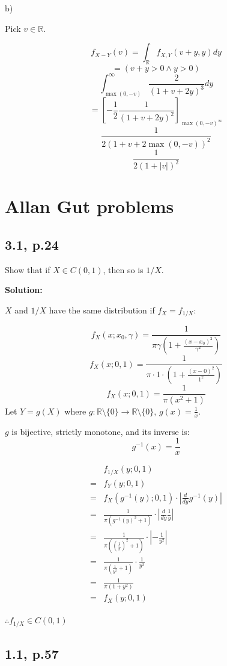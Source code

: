 \documentclass{article}
\begin{document}
b)

Pick \(v\in \mathbb{R}\).

\[f_{X-Y}(v) = \int_\mathbb{R} f_{X,Y}(v+y,y)dy\]
\[=(v+y>0 \wedge y>0)\]
\[\int_{\max(0,-v)}^\infty \frac{2}{(1+v+2y)^3}dy\]
\[=[-\frac{1}{2} \frac{1}{(1+v+2y)^2}]_{\max(0,-v)^\infty}\]
\[\frac{1}{2(1+v+2\max(0,-v))^2}\]
\[\frac{1}{2(1+|v|)^2}\]

\section{Allan Gut problems}
\subsection{3.1, p.24}

Show that if \(X \in C(0,1)\), then so is \(1/X\).

\textbf{Solution:}

\(X\) and \(1/X\) have the same distribution if \(f_X=f_{1/X}\):

\[f_X(x;x_0,\gamma) = \frac{1}{\pi\gamma(1+\frac{(x-x_0)^2}{\gamma^2})}\]
\[f_X(x;0,1) = \frac{1}{\pi \cdot 1 \cdot (1+\frac{(x-0)^2}{1^2})}\]
\[f_X(x;0,1) = \frac{1}{\pi (x^2+1)}\]
Let \(Y=g(X)\) where \(g: \mathbb{R}\setminus\{0\}\to\mathbb{R}\setminus\{0\}\), \(g(x) = \frac{1}{x}\).

\(g\) is bijective, strictly monotone, and its inverse is:
\[g^{-1}(x) = \frac{1}{x}\]

\begin{align*}
 & f_{1/X}(y;0,1) \\
=& f_Y(y;0,1) \\
=& f_X(g^{-1}(y);0,1) \cdot |\frac{d}{dy}g^{-1}(y)| \\
=& \frac{1}{\pi (g^{-1}(y)^2+1)} \cdot |\frac{d}{dy}\frac{1}{y}| \\
=& \frac{1}{\pi ((\frac{1}{y})^2+1)} \cdot |-\frac{1}{y^2}| \\
=& \frac{1}{\pi (\frac{1}{y^2}+1)} \cdot \frac{1}{y^2} \\
=& \frac{1}{\pi (1+y^2)} \\
=& f_X(y;0,1) \\
\end{align*}

\(\therefore f_{1/X}\in C(0,1)\)

\subsection{1.1, p.57}
\end{document}
